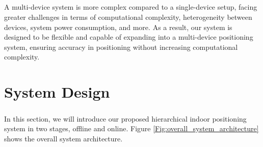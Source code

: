\documentclass[a4paper,12pt]{report}
\begin{document}
\paragraph{}
A multi-device system is more complex compared to a single-device setup, facing greater challenges in terms of computational complexity, heterogeneity between devices, system power consumption, and more. As a result, our system is designed to be flexible and capable of expanding into a multi-device positioning system, ensuring accuracy in positioning without increasing computational complexity.

\chapter{System Design}
\paragraph{}
In this section, we will introduce our proposed hierarchical indoor positioning system in two stages, offline and online. Figure \ref{Fig:overall_system_architecture} shows the overall system architecture.
\end{document}
